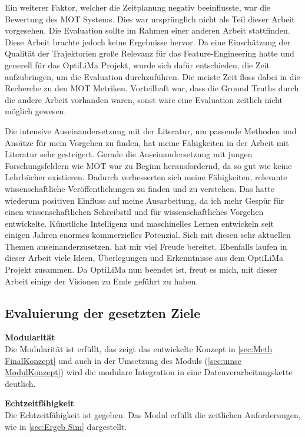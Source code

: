 Ein weiterer Faktor, welcher die Zeitplanung negativ beeinflusste, war die Bewertung des MOT Systems. Dies war ursprünglich nicht als Teil dieser Arbeit vorgesehen. Die Evaluation sollte im Rahmen einer anderen Arbeit stattfinden. Diese Arbeit brachte jedoch keine Ergebnisse hervor. Da eine Einschätzung der Qualität der Trajektorien große Relevanz für das Feature-Engineering hatte und generell für das \acrshort{OptiLiMa} Projekt, wurde sich dafür entschieden, die Zeit aufzubringen, um die Evaluation durchzuführen. Die meiste Zeit floss dabei in die Recherche zu den MOT Metriken. Vorteilhaft war, dass die Ground Truths durch die andere Arbeit vorhanden waren, sonst wäre eine Evaluation zeitlich nicht möglich gewesen.\par

Die intensive Auseinandersetzung mit der Literatur, um passende Methoden und Ansätze für mein Vorgehen zu finden, hat meine Fähigkeiten in der Arbeit mit Literatur sehr gesteigert. Gerade die Auseinandersetzung mit jungen Forschungsfeldern wie MOT war zu Beginn herausfordernd, da so gut wie keine Lehrbücher existieren. Dadurch verbesserten sich meine Fähigkeiten, relevante wissenschaftliche Veröffentlichungen zu finden und zu verstehen. Das hatte wiederum positiven Einfluss auf meine Ausarbeitung, da ich mehr Gespür für einen wissenschaftlichen Schreibstil und für wissenschaftliches Vorgehen entwickelte. Künstliche Intelligenz und maschinelles Lernen entwickeln seit einigen Jahren enormes kommerzielles Potenzial. Sich mit diesen sehr aktuellen Themen auseinanderzusetzen, hat mir viel Freude bereitet. Ebenfalls laufen in dieser Arbeit viele Ideen, Überlegungen und Erkenntnisse aus dem \acrshort{OptiLiMa} Projekt zusammen. Da \acrshort{OptiLiMa} nun beendet ist, freut es mich, mit dieser Arbeit einige der Visionen zu Ende geführt zu haben.\par


\subsection{Evaluierung der gesetzten Ziele}

\textbf{Modularität}\\
Die Modularität ist erfüllt, das zeigt das entwickelte Konzept in \ref{sec:Meth FinalKonzept} und auch in der Umsetzung des Moduls (\ref{sec:umse ModulKonzept})  wird die modulare Integration in eine Datenverarbeitungskette deutlich. \par

\textbf{Echtzeitfähigkeit}\\
Die Echtzeitfähigkeit ist gegeben. Das Modul erfüllt die zeitlichen Anforderungen, wie in \ref{sec:Ergeb Sim} dargestellt.\par

